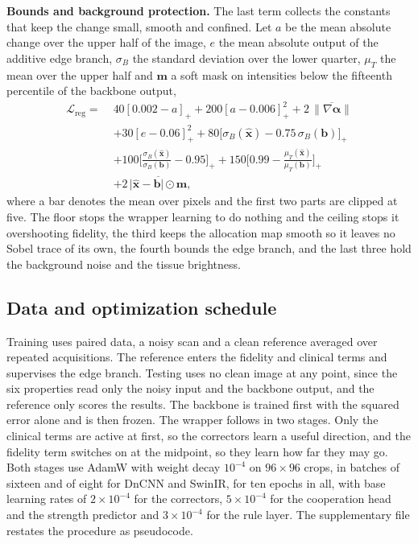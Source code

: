 \textbf{Bounds and background protection.} The last term collects the constants that keep the change
small, smooth and confined. Let $a$ be the mean absolute change over the upper half of the image, $e$
the mean absolute output of the additive edge branch, $\sigma_B$ the standard deviation over the lower
quarter, $\mu_T$ the mean over the upper half and $\mathbf{m}$ a soft mask on intensities below the
fifteenth percentile of the backbone output,
\begin{equation}
\begin{split}
\mathcal{L}_{\mathrm{reg}} = \;&40[0.002 - a]_+ + 200[a - 0.006]_+^2
 + 2\,\overline{\lVert \nabla \boldsymbol{\alpha} \rVert} \\
 &+ 30[e - 0.06]_+^2
 + 80\big[\sigma_B(\hat{\mathbf{x}}) - 0.75\,\sigma_B(\mathbf{b})\big]_+ \\
 &+ 100\Big[\tfrac{\sigma_B(\hat{\mathbf{x}})}{\sigma_B(\mathbf{b})} - 0.95\Big]_+
 + 150\Big[0.99 - \tfrac{\mu_T(\hat{\mathbf{x}})}{\mu_T(\mathbf{b})}\Big]_+ \\
 &+ 2\,\overline{\lvert \hat{\mathbf{x}} - \mathbf{b} \rvert \odot \mathbf{m}} ,
\end{split}
\label{eq:loss_reg}
\end{equation}
where a bar denotes the mean over pixels and the first two parts are clipped at five. The floor stops
the wrapper learning to do nothing and the ceiling stops it overshooting fidelity, the third keeps the
allocation map smooth so it leaves no Sobel trace of its own, the fourth bounds the edge branch, and
the last three hold the background noise and the tissue brightness.

\subsection{Data and optimization schedule}
\label{sec:paired_data}
Training uses paired data, a noisy scan and a clean reference averaged over repeated acquisitions.
The reference enters the fidelity and clinical terms and supervises the edge branch. Testing uses no
clean image at any point, since the six properties read only the noisy input and the backbone output,
and the reference only scores the results. The backbone is trained first with the squared error alone
and is then frozen. The wrapper follows in two stages. Only the clinical terms are active at first,
so the correctors learn a useful direction, and the fidelity term switches on at the midpoint, so
they learn how far they may go. Both stages use AdamW with weight decay $10^{-4}$ on
$96 \times 96$ crops, in batches of sixteen and of eight for DnCNN and SwinIR, for ten epochs in all,
with base learning rates of $2 \times 10^{-4}$ for the correctors, $5 \times 10^{-4}$ for the
cooperation head and the strength predictor and $3 \times 10^{-4}$ for the rule layer. The
supplementary file restates the procedure as pseudocode.


